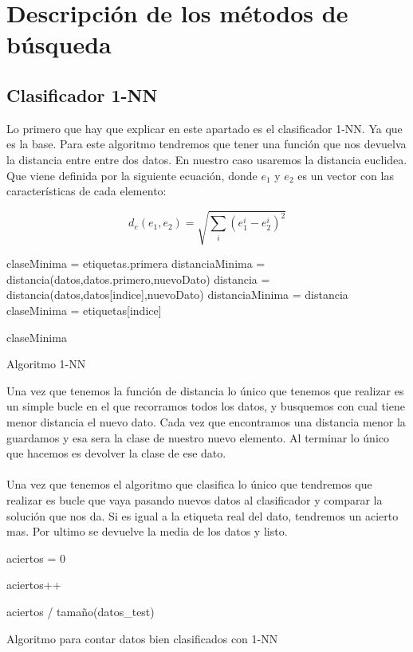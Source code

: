 \documentclass[12pt,a4paper]{article}
\begin{document}
\section{Descripción de los métodos de búsqueda}
\subsection{Clasificador 1-NN}
Lo primero que hay que explicar en este apartado es el clasificador 1-NN. Ya que es la base. Para este  algoritmo tendremos que tener una función que nos devuelva la distancia entre  entre dos datos. En nuestro caso usaremos la distancia euclidea. Que viene definida por la siguiente ecuación, donde $e_{1} $ y $e_{2}$ es un vector con las características de cada elemento:

\[ d_{e}\left(e_{1}, e_{2}\right)=\sqrt{\sum_{i}\left(e_{1}^{i}-e_{2}^{i}\right)^{2}} \]
\begin{algorithm}[H]
	\begin{algorithmic}[1]
		\State 	claseMinima = etiquetas.primera
		\State distanciaMinima = distancia(datos,datos.primero,nuevoDato)
		\State distancia = distancia(datos,datos[indice],nuevoDato)
		\State distanciaMinima = distancia
		\State claseMinima = etiquetas[indice]
		\EndIf %
		\EndFor
		
		\State \Return claseMinima
		
	\end{algorithmic}
	\label{alg:knn}
	\caption{Algoritmo 1-NN}
\end{algorithm}
Una vez que tenemos la función de distancia lo único que tenemos que realizar es un simple bucle en el que recorramos todos los datos, y busquemos con cual tiene menor distancia el  nuevo dato. Cada vez que encontramos una distancia menor la guardamos y esa sera la clase de nuestro nuevo elemento. Al terminar lo único que hacemos es devolver la clase de ese dato. \\\\

Una vez que tenemos el algoritmo que clasifica lo único que tendremos que realizar es bucle que vaya pasando nuevos datos al clasificador y comparar la solución que nos da. Si es igual a la etiqueta real del dato, tendremos un acierto mas. Por ultimo se devuelve la media de los datos y listo.
\begin{algorithm}[H]
	\begin{algorithmic}[1]
		\State 	aciertos = 0
		
		\State aciertos++
		\EndIf %
		
		
		\EndFor
		
		\State \Return aciertos / tamaño(datos\_test)
		
	\end{algorithmic}
	\label{alg:knncount}
	\caption{Algoritmo para contar datos bien clasificados con 1-NN}
\end{algorithm}
\end{document}

